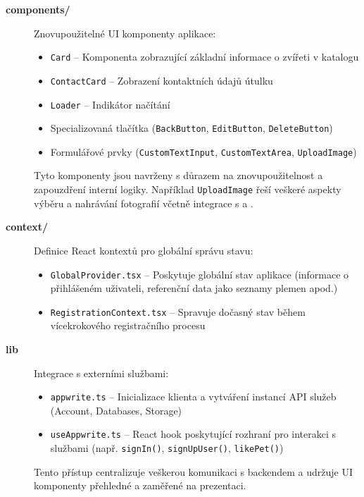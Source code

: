 \documentclass[czech, bp, kiv, he, iso690numb, pdf]{fasthesis}
\begin{document}
    \begin{description}
        \item[\textbf{components/}] Znovupoužitelné UI komponenty aplikace:
        \begin{itemize}
            \item \texttt{Card} -- Komponenta zobrazující základní informace o zvířeti v katalogu
            \item \texttt{ContactCard} -- Zobrazení kontaktních údajů útulku
            \item \texttt{Loader} -- Indikátor načítání
            \item Specializovaná tlačítka (\texttt{BackButton}, \texttt{EditButton}, \texttt{DeleteButton})
            \item Formulářové prvky (\texttt{CustomTextInput}, \texttt{CustomTextArea}, \texttt{UploadImage})
        \end{itemize}
        Tyto komponenty jsou navrženy s důrazem na znovupoužitelnost a zapouzdření interní logiky. Například \texttt{UploadImage} řeší veškeré aspekty výběru a nahrávání fotografií včetně integrace s  a .

        \item[\textbf{context/}] Definice React kontextů pro globální správu stavu:
        \begin{itemize}
            \item \texttt{GlobalProvider.tsx} -- Poskytuje globální stav aplikace (informace o přihlášeném uživateli, referenční data jako seznamy plemen apod.)
            \item \texttt{RegistrationContext.tsx} -- Spravuje dočasný stav během vícekrokového registračního procesu
        \end{itemize}

        \item[\textbf{lib\/}] Integrace s externími službami:
        \begin{itemize}
            \item \texttt{appwrite.ts} -- Inicializace  klienta a vytváření instancí API služeb (Account, Databases, Storage)
            \item \texttt{useAppwrite.ts} -- React hook poskytující rozhraní pro interakci s  službami (např. \lstinline|signIn()|, \lstinline|signUpUser()|, \lstinline|likePet()|)
        \end{itemize}
        Tento přístup centralizuje veškerou komunikaci s backendem a udržuje UI komponenty přehledné a zaměřené na prezentaci.


\end{description}
\end{document}
